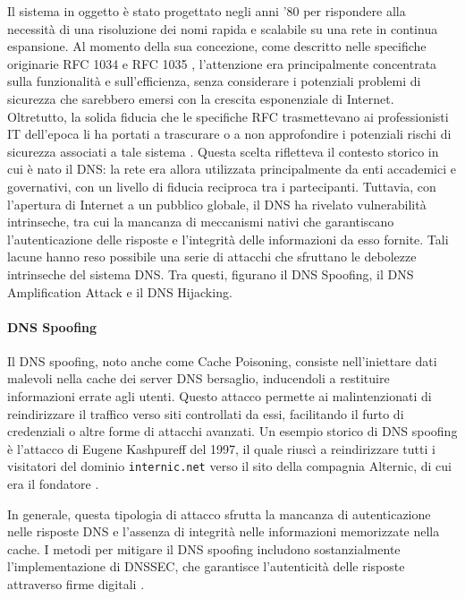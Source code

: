 Il sistema in oggetto è stato progettato negli anni '80 per rispondere alla necessità di una risoluzione dei nomi rapida e scalabile su una rete in continua espansione. Al momento della sua concezione, come descritto nelle specifiche originarie RFC 1034 \cite{rfc1034} e RFC 1035 \cite{rfc1035}, l'attenzione era principalmente concentrata sulla funzionalità e sull'efficienza, senza considerare i potenziali problemi di sicurezza che sarebbero emersi con la crescita esponenziale di Internet. Oltretutto, la solida fiducia che le specifiche RFC trasmettevano ai professionisti IT dell’epoca li ha portati a trascurare o a non approfondire i potenziali rischi di sicurezza associati a tale sistema \cite{hudaib2014dns}. Questa scelta rifletteva il contesto storico in cui è nato il DNS: la rete era allora utilizzata principalmente da enti accademici e governativi, con un livello di fiducia reciproca tra i partecipanti. Tuttavia, con l'apertura di Internet a un pubblico globale, il DNS ha rivelato vulnerabilità intrinseche, tra cui la mancanza di meccanismi nativi che garantiscano l'autenticazione delle risposte e l'integrità delle informazioni da esso fornite. Tali lacune hanno reso possibile una serie di attacchi che sfruttano le debolezze intrinseche del sistema DNS. Tra questi, figurano il DNS Spoofing, il DNS Amplification Attack e il DNS Hijacking.

\paragraph{DNS Spoofing}\label{paragraph:dns_spoofing}
Il DNS spoofing, noto anche come Cache Poisoning, consiste nell'iniettare dati malevoli nella cache dei server DNS bersaglio, inducendoli a restituire informazioni errate agli utenti. Questo attacco permette ai malintenzionati di reindirizzare il traffico verso siti controllati da essi, facilitando il furto di credenziali o altre forme di attacchi avanzati. Un esempio storico di DNS spoofing è l'attacco di Eugene Kashpureff del 1997, il quale riuscì a reindirizzare tutti i visitatori del dominio \texttt{internic.net} verso il sito della compagnia Alternic, di cui era il fondatore \cite{lioy2000dns}.

In generale, questa tipologia di attacco sfrutta la mancanza di autenticazione nelle risposte DNS e l'assenza di integrità nelle informazioni memorizzate nella cache. I metodi per mitigare il DNS spoofing includono sostanzialmente l'implementazione di DNSSEC, che garantisce l'autenticità delle risposte attraverso firme digitali \cite{rfc2535}.

